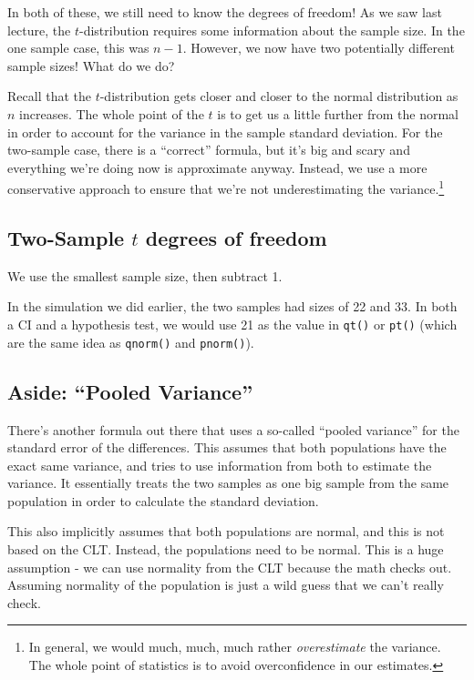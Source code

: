 \documentclass[
  letterpaper,
  DIV=11,
  numbers=noendperiod]{scrreprt}
\begin{document}
In both of these, we still need to know the degrees of freedom! As we
saw last lecture, the \(t\)-distribution requires some information about
the sample size. In the one sample case, this was \(n-1\). However, we
now have two potentially different sample sizes! What do we do?

Recall that the \(t\)-distribution gets closer and closer to the normal
distribution as \(n\) increases. The whole point of the \(t\) is to get
us a little further from the normal in order to account for the variance
in the sample standard deviation. For the two-sample case, there is a
``correct'' formula, but it's big and scary and everything we're doing
now is approximate anyway. Instead, we use a more conservative approach
to ensure that we're not underestimating the variance.\footnote{In
  general, we would much, much, much rather \emph{overestimate} the
  variance. The whole point of statistics is to avoid overconfidence in
  our estimates.}

\hypertarget{two-sample-t-degrees-of-freedom}{%
\subsection{\texorpdfstring{Two-Sample \(t\) degrees of
freedom}{Two-Sample t degrees of freedom}}\label{two-sample-t-degrees-of-freedom}}

We use the smallest sample size, then subtract 1.

In the simulation we did earlier, the two samples had sizes of 22 and
33. In both a CI and a hypothesis test, we would use 21 as the value in
\texttt{qt()} or \texttt{pt()} (which are the same idea as
\texttt{qnorm()} and \texttt{pnorm()}).

\hypertarget{aside-pooled-variance}{%
\subsection{Aside: ``Pooled Variance''}\label{aside-pooled-variance}}

There's another formula out there that uses a so-called ``pooled
variance'' for the standard error of the differences. This assumes that
both populations have the exact same variance, and tries to use
information from both to estimate the variance. It essentially treats
the two samples as one big sample from the same population in order to
calculate the standard deviation.

This also implicitly assumes that both populations are normal, and this
is not based on the CLT. Instead, the populations need to be normal.
This is a huge assumption - we can use normality from the CLT because
the math checks out. Assuming normality of the population is just a wild
guess that we can't really check.
\end{document}
